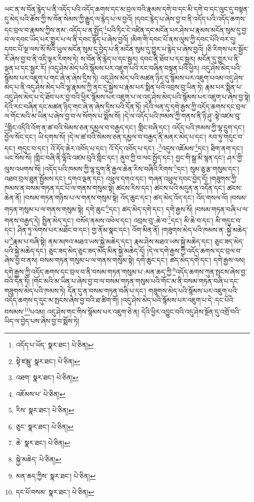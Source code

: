 ཡང་ན་ས་བོན་རྙེད་པ་ནི་འདོད་པའི་འདོད་ཆགས་དང་མ་བྲལ་བའི་རྣམས་དགེ་བ་དང་མི་དགེ་བ་དང་ལུང་དུ་བསྟན་དུ་མེད་པའི་ཆོས་ཀྱི་ས་བོན་སེམས་ཀྱི་རྒྱུད་ལ་རྙེད་པ་ལ་བྱའོ། །དབང་རྙེད་པ་ཞེས་བྱ་བ་ནི་འདོད་པའི་འདོད་ཆགས་དང་བྲལ་བ་རྣམས་ཀྱིས་ནམ་:འདོད་པ་ན་སྤྱོད་\footnote{འདོད་པ་ཡོད་  སྣར་ཐང་།  པེ་ཅིན། }པའི་ཏིང་ངེ་འཛིན་དང་མངོན་པར་ཤེས་པ་རྣམས་མངོན་སུམ་དུ་བྱ་བ་ལ་དབང་ཡོད་པར་གྱུར་པ་ལ་ནི་དབང་རྙེད་པ་ཞེས་བྱའོ། །མིག་གི་དབང་པོ་ནས་ལུས་ཀྱི་དབང་པོའི་བར་དུ། དབང་པོ་ལྔ་ལས་སོ་སོའི་ཡུལ་མངོན་སུམ་དུ་བྱེད་པ་ནི་མངོན་སུམ་དུ་གྱུར་པ་རྙེད་པ་ཞེས་བྱའོ། །ཅི་རིགས་པར་སྦྱོར་རོ་ཞེས་བྱ་བ་ནི་འདི་ལྟར་རིགས་ཏེ། ས་བོན་ནི་རྙེད་པ་དང་སྦྱར། དབང་ནི་ཐོབ་པ་དང་སྦྱར། མངོན་དུ་གྱུར་པ་ནི་ལྡན་པ་དང་སྦྱར་རོ། །འདུ་ཤེས་མེད་པའི་སྙོམས་པར་འཇུག་པའི་རང་བཞིན་བསྟན་པའི་ཕྱིར། འདུ་ཤེས་མེད་པའི་སྙོམས་པར་འཇུག་པ་གང་ཞེ་ན་ཞེས་དྲིས་ཏེ། འདུ་ཤེས་མེད་པའི་མཚན་ཉིད་དུ་སྙོམས་པར་འཇུག་པའམ་འདུ་ཤེས་མེད་པ་ནི་འདུ་ཤེས་མེད་པའི་ལྷ་རྣམས་ཀྱི་ནང་དུ་སྐྱེས་པ་རྣམ་པར་སྨིན་པའི་འབྲས་བུ་ཡིན་ཏེ། རྣམ་པར་སྨིན་པ་འདུ་ཤེས་མེད་པ་དེ་ཐོབ་པར་བྱ་བའི་ཕྱིར་སྙོམས་པར་འཇུག་པ་ལ་འདུ་ཤེས་མེད་པའི་སྙོམས་པར་འཇུག་པ་ཞེས་བྱ་སྟེ། དེའི་རང་བཞིན་དང་མཚན་ཉིད་གང་ཞེ་ན་ཞེས་དྲིས་པའི་དོན་ཏོ། །དེའི་ལན་དུ་དགེ་རྒྱས་ཀྱི་འདོད་ཆགས་དང་བྲལ་ལ་གོང་མའི་མ་ཡིན་པ་ཞེས་བྱ་བ་ལ་སོགས་པ་སྨོས་སོ། །དེ་ལ་འདོད་པའི་ཁམས་ཀྱི་གནས་ནི་ཉི་ཤུ་:སྟེ་འཛམ་བུ་\footnote{སྟེ་ཛམྦུ་  སྣར་ཐང་།  པེ་ཅིན། }གླིང་འདིའི་འོག་ན་ཚ་བའི་སེམས་ཅན་དམྱལ་བ་བརྒྱད་དང་། གླིང་བཞི་དང་། འདོད་པའི་ཁམས་ཀྱི་ལྷ་དྲུག་དང་། བྱོལ་སོང་དང་། ཡི་དགས་སོ། །དེ་ལ་ཚ་བའི་སེམས་ཅན་དམྱལ་བ་བརྒྱད་ནི་མནར་མེད་པ་དང་། རབ་ཏུ་གདུང་བ་དང་། གདུང་བ་དང་། འོ་དོད་ཆེར་འབོད་པ་དང་། འོ་དོད་འབོད་པ་དང་། :\footnote{འཐག་  སྣར་ཐང་།  པེ་ཅིན། }འདུས་འཇོམས་\footnote{འཇོམས་པ་  པེ་ཅིན། }དང་། ཐིག་ནག་དང་། ཡང་སོས་སོ། །གླིང་བཞི་ནི་ལྷོའི་འཛམ་བུའི་གླིང་དང་། ནུབ་ཀྱི་བ་ལང་སྤྱོད་དང་། བྱང་གི་སྒྲ་མི་སྙན་དང་། ཤར་གྱི་ལུས་འཕགས་སོ། །འདོད་པའི་ཁམས་ཀྱི་ལྷ་དྲུག་ནི་རྒྱལ་ཆེན་རིས་བཞིའི་རིགས་\footnote{རིས་  སྣར་ཐང་།  པེ་ཅིན། }དང་། སུམ་ཅུ་རྩ་གསུམ་དང་། འཐབ་བྲལ་ཐུན་སྤྱོམས་དང་། དགའ་ལྡན་དང་། འཕྲུལ་དགའ་དང་། གཞན་འཕྲུལ་དབང་བྱེད་དོ། །གཟུགས་ཀྱི་ཁམས་ན་བསམ་གཏན་དང་པོ་ལ་གནས་གསུམ་སྟེ། ཚངས་རིས་དང་། ཚངས་པའི་མདུན་ན་འདོན་དང་། ཚངས་ཆེན་ནོ། །བསམ་གཏན་གཉིས་པ་ལ་གནས་གསུམ་སྟེ། འོད་ཆུང་དང་། ཚད་མེད་འོད་དང་། འོད་གསལ་ལོ། །བསམ་གཏན་གསུམ་པ་ལ་གནས་གསུམ་སྟེ། དགེ་ཆུང་\footnote{ཅུང་  སྣར་ཐང་།  པེ་ཅིན། }དང་། ཚད་མེད་དགེ་དང་། དགེ་རྒྱས་སོ། །བསམ་གཏན་བཞི་པ་ལ་གནས་བརྒྱད་དེ། སྤྲིན་མེད་དང་། བསོད་ནམས་འཕེལ་དང་། འབྲས་བུ་:ཆེ་བ་\footnote{ཆེ་  སྣར་ཐང་།  པེ་ཅིན། }དང་། མི་ཆེ་བ་དང་། མི་གདུང་བ་དང་། ཤིན་ཏུ་ལེགས་པར་མཐོང་བ་དང་། གྱ་ནོམ་སྣང་དང་། འོག་མིན་ནོ། །གཟུགས་མེད་པའི་ཁམས་ན་:སྐྱེ་མཆེད་པ་\footnote{སྐྱེ་མཆེད་  པེ་ཅིན། }རྣམ་པ་བཞི་སྟེ། ནམ་མཁའ་མཐའ་ཡས་སྐྱེ་མཆེད་དང་། རྣམ་ཤེས་མཐའ་ཡས་སྐྱེ་མཆེད་དང་། ཅུང་ཟད་མེད་པའི་སྐྱེ་མཆེད་དང་། ཅུང་ཟད་མེད་ཅུང་ཟད་མེད་མིན་སྐྱེ་མཆེད་དོ། །དེ་ལ་དགེ་རྒྱས་ཀྱི་འདོད་ཆགས་དང་བྲལ་བ་ཞེས་བྱ་བ་ནས། བསམ་གཏན་གསུམ་པ་ལ་གནས་གསུམ་སྟེ། དགེ་ཆུང་དང་། ཚད་མེད་དགེ་དང་། དགེ་རྒྱས་ལས། དགེ་རྒྱས་ཀྱི་འདོད་ཆགས་དང་བྲལ་བ་ནི་བསམ་གཏན་གསུམ་པ་:མན་ཆད་ཀྱི་\footnote{མན་ཆད་ཀྱིས་  སྣར་ཐང་།  པེ་ཅིན། }འདོད་ཆགས་ཀུན་སྤངས་ཞེས་བྱ་བའི་དོན་ཏོ། །གོང་མའི་མ་ཡིན་པ་ཞེས་བྱ་བ་ལ་བསམ་གཏན་གསུམ་པའི་གོང་མ་ནི་བསམ་གཏན་བཞི་པ་དང་གཟུགས་མེད་པའི་ཁམས་ཏེ། དོན་དུ་ན་བསམ་གཏན་བཞི་པ་དང་། གཟུགས་མེད་པའི་སྙོམས་པར་འཇུག་པའི་འདོད་ཆགས་ད་དུང་མ་སྤངས་ཞེས་བྱ་བའི་ཐ་ཚིག་གོ། །འདུ་ཤེས་མེད་པའི་སྙོམས་པར་འཇུག་པ་དེ་:དང་པོའི་བསམས་\footnote{དང་པོ་བསམ་  སྣར་ཐང་།  པེ་ཅིན། }པའམ། འདུ་ཤེས་གང་གིས་སྙོམས་པར་འཇུག་ཅེ་ན། དེའི་ཕྱིར་འབྱུང་བའི་འདུ་ཤེས་སྔོན་དུ་འགྲོ་བའི་ཡིད་ལ་བྱེད་པས་ཞེས་བྱ་བ་སྨོས་ཏེ། 